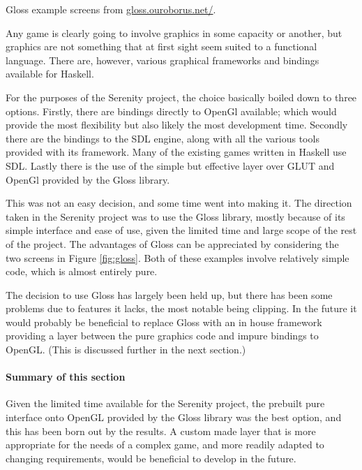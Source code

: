 \begin{marginfigure}
	\caption[Gloss example screens.]{Gloss example screens from \url{gloss.ouroborus.net/}.}
	\label{fig:gloss}
\end{marginfigure}

Any game is clearly going to involve graphics in some capacity or another, but graphics are not something that at first sight seem suited to a functional language. There are, however, various graphical frameworks and bindings available for Haskell.

For the purposes of the Serenity project, the choice basically boiled down to three options. Firstly, there are bindings directly to OpenGl available; which would provide the most flexibility but also likely the most development time. Secondly there are the bindings to the SDL engine, along with all the various tools provided with its framework. Many of the existing games written in Haskell use SDL. Lastly there is the use of the simple but effective layer over GLUT and OpenGl provided by the Gloss library.

This was not an easy decision, and some time went into making it. The direction taken in the Serenity project was to use the Gloss library, mostly because of its simple interface and ease of use, given the limited time and large scope of the rest of the project. The advantages of Gloss can be appreciated by considering the two screens in Figure \ref{fig:gloss}. Both of these examples involve relatively simple code, which is almost entirely pure.

The decision to use Gloss has largely been held up, but there has been some problems due to features it lacks, the most notable being clipping. In the future it would probably be beneficial to replace Gloss with an in house framework providing a layer between the pure graphics code and impure bindings to OpenGL. (This is discussed further in the next section.)

\paragraph{Summary of this section} Given the limited time available for the Serenity project, the prebuilt pure interface onto OpenGL provided by the Gloss library was the best option, and this has been born out by the results. A custom made layer that is more appropriate for the needs of a complex game, and more readily adapted to changing requirements, would be beneficial to develop in the future.
